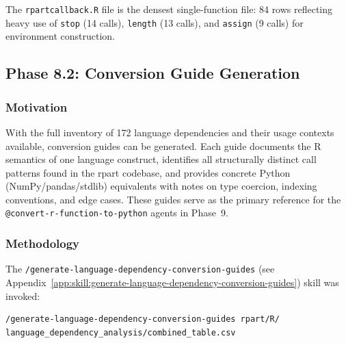 \documentclass[12pt]{article}
\newcommand{\skillapp}[2]{\texttt{/#1} (see Appendix~\ref{app:skill:#2})}
\begin{document}
The \texttt{rpartcallback.R} file is the densest single-function file: 84 rows reflecting heavy use of \texttt{stop} (14 calls), \texttt{length} (13 calls), and \texttt{assign} (9 calls) for environment construction.

\subsection{Phase 8.2: Conversion Guide Generation}
\label{sec:phase8.2}

\subsubsection{Motivation}

With the full inventory of 172 language dependencies and their usage contexts available, conversion guides can be generated. Each guide documents the R semantics of one language construct, identifies all structurally distinct call patterns found in the rpart codebase, and provides concrete Python (NumPy/pandas/stdlib) equivalents with notes on type coercion, indexing conventions, and edge cases. These guides serve as the primary reference for the \texttt{@convert-r-function-to-python} agents in Phase~9.

\subsubsection{Methodology}

The \skillapp{generate-language-dependency-conversion-guides}{generate-language-dependency-conversion-guides} skill was invoked:
\begin{lstlisting}[style=skill]
/generate-language-dependency-conversion-guides rpart/R/ language_dependency_analysis/combined_table.csv
\end{lstlisting}
\end{document}
